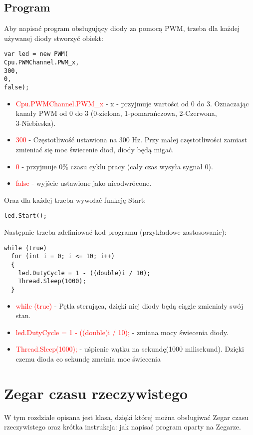 \documentclass{article}
\begin{document}
\subsection{Program}
Aby napisać program obsługujący diody za pomocą PWM, trzeba dla każdej używanej diody stworzyć obiekt:
\begin{lstlisting}[frame=single]
var led = new PWM(
Cpu.PWMChannel.PWM_x,
300,
0,
false);
\end{lstlisting}
\begin{itemize}
\item \textcolor{red}{Cpu.PWMChannel.PWM\_x} - x - przyjmuje wartości od 0 do 3. Oznaczając kanały PWM od 0 do 3 (0-zielona, 1-pomarańczowa, 2-Czerwona, \\ 3-Niebieska).
\item \textcolor{red}{300} - Częstotliwość ustawiona na 300 Hz. Przy małej częstotliwości zamiast zmieniać się moc świecenie diod, diody będą migać.
\item \textcolor{red}{0} - przyjmuje 0\% czasu cyklu pracy (cały czas wysyła sygnał 0).
\item \textcolor{red}{false} - wyjście ustawione jako nieodwrócone.
\end{itemize}
Oraz dla każdej trzeba wywołać funkcję Start:
\begin{lstlisting}[frame=single]
led.Start();
\end{lstlisting}
Następnie trzeba zdefiniować kod programu (przykładowe zastosowanie):
\begin{lstlisting}[frame=single]
while (true)
  for (int i = 0; i <= 10; i++)
  {
    led.DutyCycle = 1 - ((double)i / 10);
    Thread.Sleep(1000);
  }
\end{lstlisting}
\begin{itemize}
\item \textcolor{red}{while (true)} - Pętla sterująca, dzięki niej diody będą ciągle zmieniały swój stan.
\item \textcolor{red}{led.DutyCycle = 1 - ((double)i / 10);} - zmiana mocy świecenia diody.
\item \textcolor{red}{Thread.Sleep(1000);} - uśpienie wątku na sekundę(1000 milisekund). Dzięki czemu dioda co sekundę zmeinia moc świecenia
\end{itemize}

\section{Zegar czasu rzeczywistego}
W tym rozdziale opisana jest klasa, dzięki której można obsługiwać Zegar czasu rzeczywistego oraz krótka instrukcja: jak napisać program oparty na Zegarze.
\end{document}
